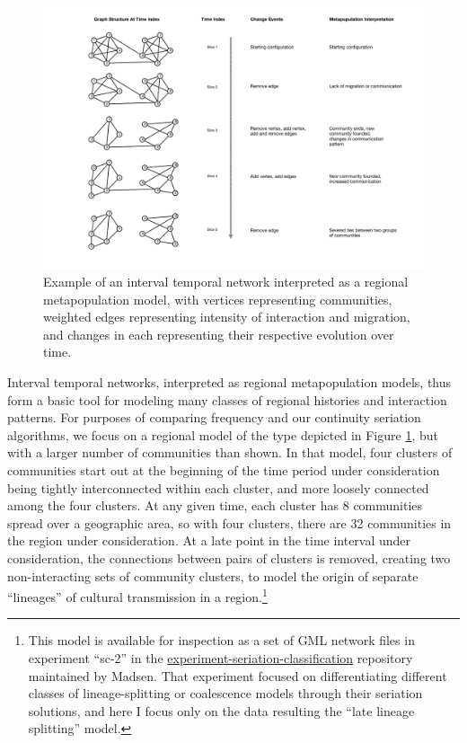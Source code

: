 \documentclass[graybox,natbib]{svmult}
\begin{document}
\begin{figure}[ht]
\centering
\includegraphics[scale=0.25]{interval-temporal-network-with-interpretation.pdf}
\caption{Example of an interval temporal network interpreted as a regional metapopulation model, with vertices representing communities, weighted edges representing intensity of interaction and migration, and changes in each representing their respective evolution over time.}
\label{img:itn-example}
\end{figure}

Interval temporal networks, interpreted as regional metapopulation
models, thus form a basic tool for modeling many classes of regional
histories and interaction patterns. For purposes of comparing frequency
and our continuity seriation algorithms, we focus on a regional model of
the type depicted in Figure \ref{img:itn-example}, but with a larger
number of communities than shown. In that model, four clusters of
communities start out at the beginning of the time period under
consideration being tightly interconnected within each cluster, and more
loosely connected among the four clusters. At any given time, each
cluster has 8 communities spread over a geographic area, so with four
clusters, there are 32 communities in the region under consideration. At
a late point in the time interval under consideration, the connections
between pairs of clusters is removed, creating two non-interacting sets
of community clusters, to model the origin of separate ``lineages'' of
cultural transmission in a region.\footnote{This model is available for
  inspection as a set of GML network files in experiment ``sc-2'' in the
  \href{https://github.com/mmadsen/experiment-seriation-classification}{experiment-seriation-classification}
  repository maintained by Madsen. That experiment focused on
  differentiating different classes of lineage-splitting or coalescence
  models through their seriation solutions, and here I focus only on the
  data resulting the ``late lineage splitting'' model.}
\end{document}
